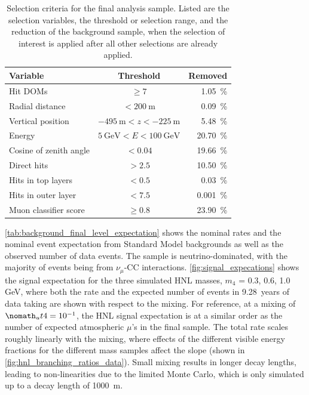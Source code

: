 \documentclass[
    aps,
    prd,
    reprint,
    amsmath,
    amssymb,
    nofootinbib,
    linenumbers,
    superscriptaddress,
    floatfix
]{revtex4-2}
\newcommand{\gev}{\giga\electronvolt}
\def\nomathut4{|U_{\tau4}|^2} %
\providecommand{\DIFaddtex}[1]{{\protect\color{blue}\uwave{#1}}} %
\providecommand{\DIFdeltex}[1]{{\protect\color{red}\sout{#1}}}                      %
\providecommand{\DIFaddbegin}{} %
\providecommand{\DIFaddend}{} %
\providecommand{\DIFdelbegin}{} %
\providecommand{\DIFdelend}{} %
\providecommand{\DIFadd}[1]{\texorpdfstring{\DIFaddtex{#1}}{#1}} %
\providecommand{\DIFdel}[1]{\texorpdfstring{\DIFdeltex{#1}}{}} %
\newcommand{\DIFscaledelfig}{0.5}
\newlength{\DIFdelgraphicswidth} %
\newlength{\DIFdelgraphicsheight} %
\newcommand{\DIFaddincludegraphics}[2][]{{\color{blue}\fbox{\DIFOincludegraphics[#1]{#2}}}} %
\newcommand{\DIFdelincludegraphics}[2][]{%
\sbox{\DIFdelgraphicsbox}{\DIFOincludegraphics[#1]{#2}}%
\settoboxwidth{\DIFdelgraphicswidth}{\DIFdelgraphicsbox} %
\settoboxtotalheight{\DIFdelgraphicsheight}{\DIFdelgraphicsbox} %
\scalebox{\DIFscaledelfig}{%
\parbox[b]{\DIFdelgraphicswidth}{\usebox{\DIFdelgraphicsbox}\\[-\baselineskip] \rule{\DIFdelgraphicswidth}{0em}}\llap{\resizebox{\DIFdelgraphicswidth}{\DIFdelgraphicsheight}{%
\setlength{\unitlength}{\DIFdelgraphicswidth}%
\begin{picture}(1,1)%
\thicklines\linethickness{2pt} %
{\color[rgb]{1,0,0}\put(0,0){\framebox(1,1){}}}%
{\color[rgb]{1,0,0}\put(0,0){\line( 1,1){1}}}%
{\color[rgb]{1,0,0}\put(0,1){\line(1,-1){1}}}%
\end{picture}%
}\hspace*{3pt}}} %
} %
\DeclareRobustCommand{\DIFaddbegin}{\DIFOaddbegin \let\includegraphics\DIFaddincludegraphics} %
\DeclareRobustCommand{\DIFaddend}{\DIFOaddend \let\includegraphics\DIFOincludegraphics} %
\DeclareRobustCommand{\DIFdelbegin}{\DIFOdelbegin \let\includegraphics\DIFdelincludegraphics} %
\DeclareRobustCommand{\DIFdelend}{\DIFOaddend \let\includegraphics\DIFOincludegraphics} %
\begin{document}
\begin{table}[h]
    \footnotesize
        \begin{tabular}{ lcr }
        \hline\hline    
        \textbf{Variable} & \textbf{Threshold} & \textbf{Removed} \\
        \hline\hline    
        Hit DOMs & $\geq 7$ & \SI{1.05}{\percent} \\
        Radial distance & $< \SI{200}{\meter}$ & \SI{0.09}{\percent} \\
        Vertical position & $\SI{-495}{\meter} < z < \SI{-225}{\meter}$ & \SI{5.48}{\percent} \\
        Energy & $\SI{5}{\gev} < E < \SI{100}{\gev}$ & \SI{20.70}{\percent} \\    
        Cosine of zenith angle & $< 0.04$ & \SI{19.66}{\percent} \\
        Direct hits & $> 2.5$ & \SI{10.50}{\percent} \\
        Hits in top layers & $< 0.5$ & \SI{0.03}{\percent} \\
        Hits in outer layer & $< 7.5$ & \SI{0.001}{\percent} \\
        Muon classifier score & $\geq 0.8$ & \SI{23.90}{\percent} \\
        \hline
        \end{tabular}
    \internallinenumbers
    \caption{Selection criteria for the final analysis sample. Listed are the selection variables, the threshold or selection range, and the reduction of the background sample, when the selection of interest is applied after all other selections are already applied.}
    \label{tab:analysis_cuts}
\end{table}

\cref{tab:background_final_level_expectation} shows the nominal rates and the nominal event expectation from Standard Model backgrounds as well as the observed number of data events. The sample is neutrino-dominated, with the majority of events being from $\nu_\mu$-CC interactions. \cref{fig:signal_expecations} shows the signal expectation for the three simulated HNL masses, $m_4$ = {0.3, 0.6, 1.0}\,GeV, where both the rate and the expected number of events in \SI{9.28}{years} of data taking are shown with respect to the mixing. For reference, at a mixing of \DIFdelbegin \DIFdel{$\nomath_ut4=10^{-1}$}\DIFdelend \DIFaddbegin \DIFadd{$\nomathut4=10^{-1}$}\DIFaddend , the HNL signal expectation is at a similar order as the number of expected atmospheric $\mu$'s in the final sample. The total rate scales roughly linearly with the mixing, where effects of the different visible energy fractions for the different mass samples affect the slope (shown in \cref{fig:hnl_branching_ratios_data}). Small mixing results in longer decay lengths, leading to non-linearities due to the limited Monte Carlo, which is only simulated up to a decay length of \SI{1000}{\meter}.
\end{document}
